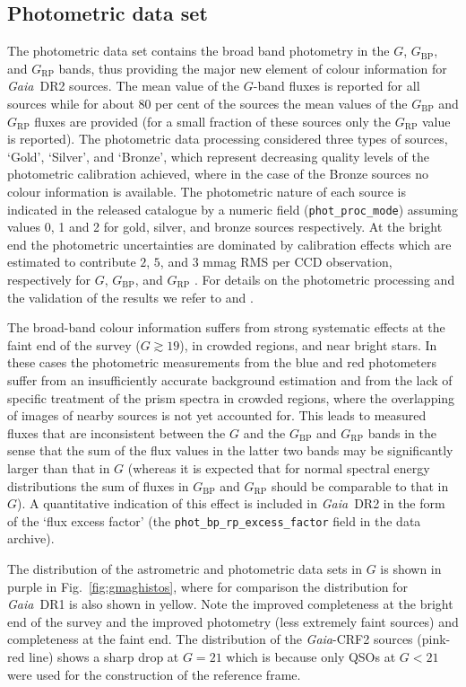 \documentclass[longauth]{aa_gaia} %
\newcommand\gaia{\textit{Gaia}}
\newcommand\gdr[1]{\gaia~DR#1}
\newcommand\gaiacrftwo{\gaia-CRF2}
\newcommand\figref[1]{Fig.~\ref{#1}}
\newcommand\gbp{\ensuremath{G_\mathrm{BP}}}
\newcommand\grp{\ensuremath{G_\mathrm{RP}}}
\begin{document}
\subsection{Photometric data set}
\label{sec:photdata}

The photometric data set contains the broad band photometry in the $G$, {\gbp}, and {\grp} bands,
thus providing the major new element of colour information for \gdr{2} sources. The mean value of
the $G$-band fluxes is reported for all sources while for about 80 per cent of the sources the mean
values of the {\gbp} and {\grp} fluxes are provided (for a small fraction of these sources only
the {\grp} value is reported). The photometric data processing considered three types of sources,
`Gold', `Silver', and `Bronze', which represent decreasing quality levels of the photometric
calibration achieved, where in the case of the Bronze sources no colour information is available. 
The photometric nature of each source is indicated in the released catalogue by a numeric field
(\texttt{phot\_proc\_mode}) assuming values 0, 1 and 2 for gold, silver, and bronze sources
respectively. At the bright end the photometric uncertainties are dominated by calibration effects
which are estimated to contribute $2$, $5$, and $3$ mmag RMS per CCD observation, respectively for
$G$, {\gbp}, and {\grp} \citep{DR2-DPACP-40}. For details on the photometric processing and the
validation of the results we refer to \cite{DR2-DPACP-44} and \cite{DR2-DPACP-40}.

The broad-band colour information suffers from strong systematic effects at the faint end of the
survey ($G\gtrsim19$), in crowded regions, and near bright stars. In these cases the photometric
measurements from the blue and red photometers suffer from an insufficiently accurate background
estimation and from the lack of specific treatment of the prism spectra in crowded regions, where
the overlapping of images of nearby sources is not yet accounted for. This leads to measured fluxes
that are inconsistent between the $G$ and the {\gbp} and {\grp} bands in the sense that the sum of
the flux values in the latter two bands may be significantly larger than that in $G$ (whereas it is
expected that for normal spectral energy distributions the sum of fluxes in $\gbp$ and {\grp} should
be comparable to that in $G$). A quantitative indication of this effect is included in \gdr{2} in
the form of the `flux excess factor' (the \texttt{phot\_bp\_rp\_excess\_factor} field in the
data archive).

The distribution of the astrometric and photometric data sets in $G$ is shown in purple in
\figref{fig:gmaghistos}, where for comparison the distribution for \gdr{1} is also shown in yellow.
Note the improved completeness at the bright end of the survey and the improved photometry (less
extremely faint sources) and completeness at the faint end. The distribution of the {\gaiacrftwo}
sources (pink-red line) shows a sharp drop at $G=21$ which is because only QSOs at $G<21$ were used
for the construction of the reference frame.
\end{document}
